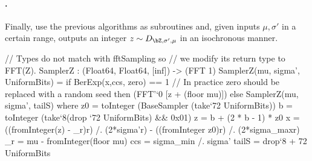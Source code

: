 \paragraph{\samplerz.} Finally, \longsamplerz use the previous algorithms as subroutines and, given inputs $\mu, \sigma'$ in a certain range, outputs an integer $z \sim D_{\bZ, \sigma', \mu}$ in an isochronous manner.

\begin{algorithm}[!htb]
	\caption{$\samplerz(\mu, \sigma')$}\label{alg:samplerz}
	\begin{algorithmic}[1]
		\Comment{$r$ must be in $[0, 1)$}
		 
		\label{line:sign}
		\EndIf
		\EndWhile
	\end{algorithmic}
\end{algorithm}

\begin{code}
  // Types do not match with fftSampling so
  // we modify its return type to FFT(Z).
  SamplerZ : (Float64, Float64, [inf]) -> (FFT 1)
  SamplerZ(mu, sigma', UniformBits) =
    if BerExp(x,ccs, zero) == 1
    // In practice zero should be replaced with a random seed
    then (FFT'`{0} [z + (floor mu)])
    else SamplerZ(mu, sigma', tailS)
      where
        z0 = toInteger (BaseSampler (take`{72} UniformBits))
        b = toInteger (take`{8}(drop `{72} UniformBits) && 0x01)
        z = b + (2 * b - 1) * z0
        x = ((fromInteger(z) - _r)^^2) /. (2*sigma'^^2)
          - ((fromInteger z0)^^2) /. (2*sigma_max^^2)
        _r = mu - fromInteger(floor mu)
        ccs = sigma_min /. sigma'
        tailS = drop`{8 + 72} UniformBits
\end{code}



\newcommand{\randombytes}{\texttt{randombytes}\xspace}

